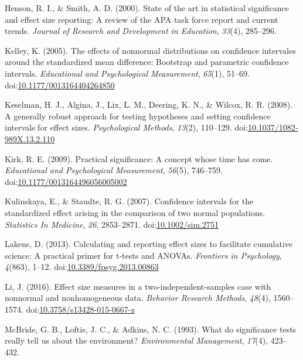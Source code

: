 \documentclass[
  man,floatsintext]{apa6}
\begin{document}
\leavevmode\hypertarget{ref-Henson_Smith_2000}{}%
Henson, R. I., \& Smith, A. D. (2000). State of the art in statistical significance and effect size reporting: A review of the APA task force report and current trends. \emph{Journal of Research and Development in Education}, \emph{33}(4), 285--296.

\leavevmode\hypertarget{ref-Kelley_2005}{}%
Kelley, K. (2005). The effects of nonnormal distributions on confidence intervales around the standardized mean difference: Bootstrap and parametric confidence intervals. \emph{Educational and Psychological Measurement}, \emph{65}(1), 51--69. doi:\href{https://doi.org/10.1177/0013164404264850}{10.1177/0013164404264850}

\leavevmode\hypertarget{ref-Keselman_et_al_2008}{}%
Keselman, H. J., Algina, J., Lix, L. M., Deering, K. N., \& Wilcox, R. R. (2008). A generally robust approach for testing hypotheses and setting confidence intervals for effect sizes. \emph{Psychological Methods}, \emph{13}(2), 110--129. doi:\href{https://doi.org/10.1037/1082-989X.13.2.110}{10.1037/1082-989X.13.2.110}

\leavevmode\hypertarget{ref-Kirk_2009}{}%
Kirk, R. E. (2009). Practical significance: A concept whose time has come. \emph{Educational and Psychological Measurement}, \emph{56}(5), 746--759. doi:\href{https://doi.org/10.1177/0013164496056005002\%20}{10.1177/0013164496056005002 }

\leavevmode\hypertarget{ref-Kulinskaya_Staudte_2007}{}%
Kulinskaya, E., \& Staudte, R. G. (2007). Confidence intervals for the standardized effect arising in the comparison of two normal populations. \emph{Statistics In Medicine}, \emph{26}, 2853--2871. doi:\href{https://doi.org/10.1002/sim.2751}{10.1002/sim.2751}

\leavevmode\hypertarget{ref-Lakens_2013}{}%
Lakens, D. (2013). Calculating and reporting effect sizes to facilitate cumulative science: A practical primer for t-tests and ANOVAs. \emph{Frontiers in Psychology}, \emph{4}(863), 1--12. doi:\href{https://doi.org/10.3389/fpsyg.2013.00863}{10.3389/fpsyg.2013.00863}

\leavevmode\hypertarget{ref-Li_2016}{}%
Li, J. (2016). Effect size measures in a two-independent-samples case with nonnormal and nonhomogeneous data. \emph{Behavior Research Methods}, \emph{48}(4), 1560--1574. doi:\href{https://doi.org/10.3758/s13428-015-0667-z}{10.3758/s13428-015-0667-z}

\leavevmode\hypertarget{ref-McBride_et_al_1993}{}%
McBride, G. B., Loftis, J. C., \& Adkins, N. C. (1993). What do significance tests really tell us about the environment? \emph{Environmental Management}, \emph{17}(4), 423--432.
\end{document}
